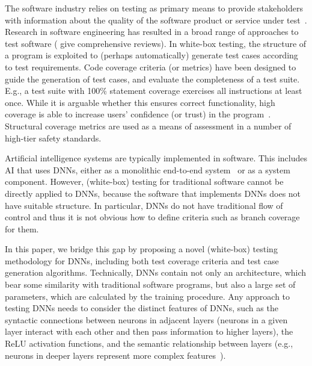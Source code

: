\documentclass[runningheads,a4paper]{llncs}
\begin{document}
The software industry relies on testing as primary means to provide
stakeholders with information about the quality of the software product or
service under test~\cite{kaner2006}.
%
Research in software engineering has resulted in a broad range of approaches
to test software (\cite{ZHM1997,JH2011,SWMPHS2017} give comprehensive
reviews).  In white-box testing, the structure of a program is exploited to
(perhaps automatically) generate test cases according to test requirements. 
Code coverage criteria (or metrics) have been designed to guide the
generation of test cases, and evaluate the completeness of a test suite. 
E.g., a test suite with 100\% statement coverage exercises all instructions
at least once.  While it is arguable whether this ensures correct
functionality, high coverage is able to increase users' confidence (or
trust) in the program~\cite{ZHM1997}. Structural coverage metrics are used
as a means of assessment in a number of high-tier safety standards.

Artificial intelligence systems are typically implemented in software.  This
includes AI that uses DNNs, either as a monolithic end-to-end
system~\cite{NVIDIA} or as a system component.  However, (white-box) testing
for traditional software cannot be directly applied to DNNs, because the
software that implements DNNs does not have suitable structure.  In
particular, DNNs do not have traditional flow of control and thus it is not
obvious how to define criteria such as branch coverage for them.

In this paper, we bridge this gap by proposing a novel (white-box) testing
methodology for DNNs, including both test coverage criteria and test case
generation algorithms.  Technically, DNNs contain not only an architecture,
which bear some similarity with traditional software programs, but also a
large set of parameters, which are calculated by the training procedure. 
Any approach to testing DNNs needs to consider the distinct features of
DNNs, such as the syntactic connections between neurons in adjacent layers
(neurons in a given layer interact with each other and then pass information
to higher layers), the ReLU activation functions, and the semantic
relationship between layers (e.g., neurons in deeper layers represent more
complex features~\cite{YCNFL2015,olah2018the}).
\end{document}
